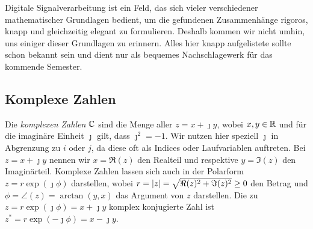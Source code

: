 \begin{itemize}
\end{itemize}

Digitale Signalverarbeitung ist ein Feld, das sich vieler verschiedener mathematischer Grundlagen bedient, um die gefundenen Zusammenh\"ange rigoros, knapp und gleichzeitig elegant zu formulieren.
Deshalb kommen wir nicht umhin, uns einiger dieser Grundlagen zu erinnern. 
Alles hier knapp aufgelistete sollte schon bekannt sein und dient nur als bequemes Nachschlagewerk f\"ur das kommende Semester.

\subsection{Komplexe Zahlen}

Die \emph{komplexen Zahlen} $\mathbb{C}$ sind die Menge aller $z = x + \jmath y$, wobei $x,y \in \mathbb{R}$ und f\"ur die imagin\"are Einheit $\jmath$ gilt, dass $\jmath^2 = -1$.
Wir nutzen hier speziell $\jmath$ in Abgrenzung zu $i$ oder $j$, da diese oft als Indices oder Laufvariablen auftreten.
Bei $z = x + \jmath y$ nennen wir $x =\Re(z)$ den Realteil und respektive $y = \Im(z)$ den Imagin\"arteil.
Komplexe Zahlen lassen sich auch in der Polarform $z = r \exp(\jmath \phi)$ darstellen, wobei $r = {\left| z \right|} = \sqrt{\Re(z)^2 + \Im(z)^2} \geq 0$ den Betrag und $\phi = \angle(z) = \arctan(y,x)$ das Argument von $z$ darstellen.
Die zu $z = r \exp(\jmath \phi) = x + \jmath y$ komplex konjugierte Zahl ist $z^\ast = r \exp(-\jmath \phi) = x - \jmath y$.

